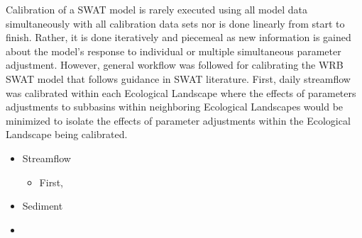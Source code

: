 Calibration of a SWAT model is rarely executed using all model data
simultaneously with all calibration data sets nor is done linearly from start
to finish. Rather, it is done iteratively and piecemeal as new information
is gained about the model's response to individual or multiple simultaneous
parameter adjustment. However, general workflow was followed for
calibrating the WRB SWAT model that follows guidance in SWAT literature. First,
daily streamflow was calibrated within each Ecological Landscape where the
effects of parameters adjustments to subbasins within neighboring Ecological
Landscapes would be minimized to isolate the effects of parameter adjustments
within the Ecological Landscape being calibrated.

\begin{itemize}
    \item Streamflow
    \begin{itemize}
        \item First,
    \end{itemize}
    \item Sediment
    \item
\end{itemize}

\pagebreak